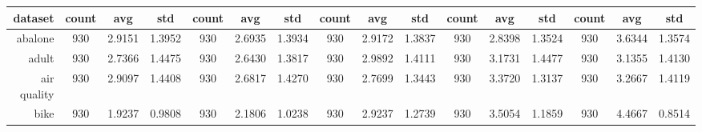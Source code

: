 \begin{table}[htbp]
{\begin{tabular}{rccccccccccccccc}
			\cmidrule{2-16}    \textbf{dataset} & \textbf{count}                       & \textbf{avg}                                                                       & \textbf{std}    & \textbf{count} & \textbf{avg}                                                              & \textbf{std}    & \textbf{count} & \textbf{avg}                                                              & \textbf{std}    & \textbf{count} & \textbf{avg}                                                              & \textbf{std}    & \textbf{count} & \textbf{avg}    & \textbf{std}    \\
			\midrule
			abalone                             & 930                                  & 2.9151                                                                             & 1.3952          & 930            & \cellcolor[rgb]{ .776,  .937,  .808}\textcolor[rgb]{ 0,  .38,  0}{2.6935} & 1.3934          & 930            & 2.9172                                                                    & 1.3837          & 930            & 2.8398                                                                    & 1.3524          & 930            & 3.6344          & 1.3574          \\
			adult                               & 930                                  & 2.7366                                                                             & 1.4475          & 930            & 2.6430                                                                    & 1.3817          & 930            & 2.9892                                                                    & 1.4111          & 930            & 3.1731                                                                    & 1.4477          & 930            & 3.1355          & 1.4130          \\
			air quality                         & 930                                  & 2.9097                                                                             & 1.4408          & 930            & \cellcolor[rgb]{ .776,  .937,  .808}\textcolor[rgb]{ 0,  .38,  0}{2.6817} & 1.4270          & 930            & 2.7699                                                                    & 1.3443          & 930            & 3.3720                                                                    & 1.3137          & 930            & 3.2667          & 1.4119          \\
			bike                                & 930                                  & 1.9237                                                                             & 0.9808          & 930            & 2.1806                                                                    & 1.0238          & 930            & 2.9237                                                                    & 1.2739          & 930            & 3.5054                                                                    & 1.1859          & 930            & 4.4667          & 0.8514          \\

\end{tabular}}
\end{table}
